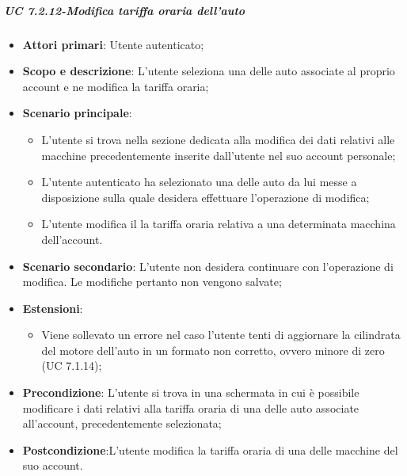         \subparagraph{UC 7.2.12-Modifica tariffa oraria dell'auto}
            \begin{itemize}
                \item \textbf{Attori primari}: Utente autenticato;
               
                \item \textbf{Scopo e descrizione}: L'utente seleziona una delle auto associate al proprio account e ne modifica la tariffa oraria; 
                \item \textbf{Scenario principale}:
                    \begin{itemize}
                        \item L'utente si trova nella sezione dedicata alla modifica dei dati relativi alle macchine precedentemente inserite dall'utente nel suo account personale;
                        \item L'utente autenticato ha selezionato una delle auto da lui messe a disposizione sulla quale desidera effettuare l'operazione di modifica;
                        \item L'utente modifica il la tariffa oraria relativa a una determinata macchina dell'account.
                    \end{itemize}
                \item \textbf{Scenario secondario}: L'utente non desidera continuare con l'operazione di modifica. Le modifiche pertanto non vengono salvate;
                \item \textbf{Estensioni}:
                    \begin{itemize}
                        \item Viene sollevato un errore nel caso l'utente tenti di aggiornare la cilindrata del motore dell'auto in un formato non corretto, ovvero minore di zero (UC 7.1.14); 
                    \end{itemize}
                \item \textbf{Precondizione}: L'utente si trova in una schermata in cui è possibile modificare i dati relativi alla tariffa oraria di una delle auto associate all'account, precedentemente selezionata;
                \item \textbf{Postcondizione}:L'utente modifica la tariffa oraria di una delle macchine del suo account.
            \end{itemize}
    
